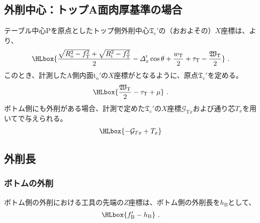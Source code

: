 \subsection{外削中心：トップA面肉厚基準の場合}
テーブル中心Pを原点としたトップ側外削中心$\mathfrak T_\mathrm c'$の（おおよその）$X$座標は、より、
\begin{align*}
  \HLbox{%
    \frac{\sqrt{R_\mathrm o^2-f_\mathrm T^2}+\sqrt{R_\mathrm i^2-f_\mathrm T^2}}2
    -\varDelta_x'\cos\theta
    +\frac{w_\mathrm T}2
    +\tau_\mathrm T
    -\frac{\mathfrak W_\mathrm T}2
  }\ .
\end{align*}
このとき、計測したA側内面t$_\mathrm o'$の$X$座標がとなるように、原点$\mathfrak T_\mathrm c'$を定める。
\begin{align*}
  \HLbox{\frac{\mathfrak W_\mathrm T}2-\tau_\mathrm T+\mu}~.
\end{align*}
ボトム側にも外削がある場合、計測で定めた$\mathfrak T_\mathrm c'$の$X$座標$\mathcal G_{\mathrm Tx}$および通り芯$T_x$を用いてで与えられる。
\begin{align*}
  \HLbox{-\mathcal G_{Tx}+T_x}
\end{align*}

\subsection{外削長}

\subsubsection{ボトムの外削}
ボトム側の外削における工具の先端の$Z$座標は、ボトム側の外削長を$h_\mathrm B$として、
\begin{align*}
  \HLbox{f_\mathrm B'-h_\mathrm B}\ .
\end{align*}


